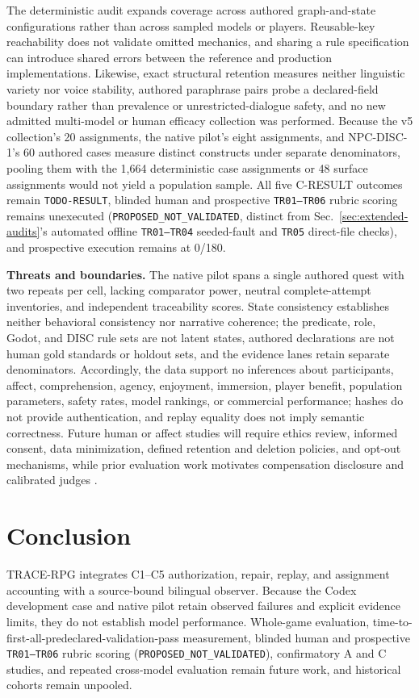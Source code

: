 \documentclass[journal]{IEEEtran}
\newcommand{\system}{TRACE-RPG}
\begin{document}
The deterministic audit expands coverage across authored graph-and-state configurations rather than across sampled models or players. Reusable-key reachability does not validate omitted mechanics, and sharing a rule specification can introduce shared errors between the reference and production implementations. Likewise, exact structural retention measures neither linguistic variety nor voice stability, authored paraphrase pairs probe a declared-field boundary rather than prevalence or unrestricted-dialogue safety, and no new admitted multi-model or human efficacy collection was performed.
Because the v5 collection's 20 assignments, the native pilot's eight assignments, and NPC-DISC-1's 60 authored cases measure distinct constructs under separate denominators, pooling them with the 1,664 deterministic case assignments or 48 surface assignments would not yield a population sample. All five C-RESULT outcomes remain \texttt{TODO-RESULT}, blinded human and prospective \texttt{TR01--TR06} rubric scoring remains unexecuted (\texttt{PROPOSED\_NOT\_VALIDATED}, distinct from Sec.~\ref{sec:extended-audits}'s automated offline \texttt{TR01--TR04} seeded-fault and \texttt{TR05} direct-file checks), and prospective execution remains at 0/180.

\textbf{Threats and boundaries.} The native pilot spans a single authored quest with two repeats per cell, lacking comparator power, neutral complete-attempt inventories, and independent traceability scores. State consistency establishes neither behavioral consistency \cite{S55_huang2026beyond} nor narrative coherence; the predicate, role, Godot, and DISC rule sets are not latent states, authored declarations are not human gold standards or holdout sets, and the evidence lanes retain separate denominators. Accordingly, the data support no inferences about participants, affect, comprehension, agency, enjoyment, immersion, player benefit, population parameters, safety rates, model rankings, or commercial performance; hashes do not provide authentication, and replay equality does not imply semantic correctness. Future human or affect studies will require ethics review, informed consent, data minimization, defined retention and deletion policies, and opt-out mechanisms, while prior evaluation work motivates compensation disclosure and calibrated judges \cite{S27_vanderlee2019best,S28_karpinska2021perils,S29_zheng2023judging,S30_chen2024judgement}.


\section{Conclusion}
\system{} integrates C1--C5 authorization, repair, replay, and assignment accounting with a source-bound bilingual observer. Because the Codex development case and native pilot retain observed failures and explicit evidence limits, they do not establish model performance. Whole-game evaluation, time-to-first-all-predeclared-validation-pass measurement, blinded human and prospective \texttt{TR01--TR06} rubric scoring (\texttt{PROPOSED\_NOT\_VALIDATED}), confirmatory A and C studies, and repeated cross-model evaluation remain future work, and historical cohorts remain unpooled.
\end{document}

